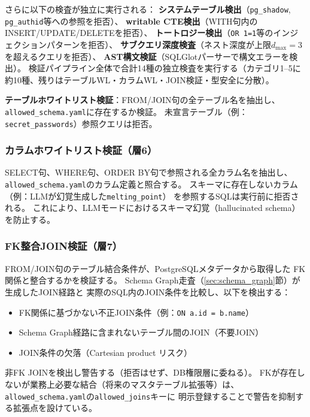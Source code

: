 \documentclass[5p,twocolumn]{elsarticle}
\begin{document}
さらに以下の検査が独立に実行される：
\textbf{システムテーブル検出}（\texttt{pg\_shadow}, \texttt{pg\_authid}等への参照を拒否）、
\textbf{writable CTE検出}（WITH句内のINSERT/UPDATE/DELETEを拒否）、
\textbf{トートロジー検出}（\texttt{OR 1=1}等のインジェクションパターンを拒否）、
\textbf{サブクエリ深度検査}（ネスト深度が上限$d_{\max}=3$を超えるクエリを拒否）、
\textbf{AST構文検証}（SQLGlotパーサーで構文エラーを検出）。
検証パイプライン全体で合計14種の独立検査を実行する（カテゴリ1--5に約10種、残りはテーブルWL・カラムWL・JOIN検証・型安全に分散）。

\textbf{テーブルホワイトリスト検証}：FROM/JOIN句の全テーブル名を抽出し、
\texttt{allowed\_schema.yaml}に存在するか検証。
未宣言テーブル（例：\texttt{secret\_passwords}）参照クエリは拒否。

\subsubsection{カラムホワイトリスト検証（層6）}
\label{sec:column_wl}

SELECT句、WHERE句、ORDER BY句で参照される全カラム名を抽出し、
\texttt{allowed\_schema.yaml}のカラム定義と照合する。
スキーマに存在しないカラム（例：LLMが幻覚生成した\texttt{melting\_point}）
を参照するSQLは実行前に拒否される。
これにより、LLMモードにおけるスキーマ幻覚（hallucinated schema）を防止する。

\subsubsection{FK整合JOIN検証（層7）}
\label{sec:join_validation}

FROM/JOIN句のテーブル結合条件が、PostgreSQLメタデータから取得した
FK関係と整合するかを検証する。
Schema Graph走査（\ref{sec:schema_graph}節）が生成したJOIN経路と
実際のSQL内のJOIN条件を比較し、以下を検出する：

\begin{itemize}
  \item FK関係に基づかない不正JOIN条件（例：\texttt{ON a.id = b.name}）
  \item Schema Graph経路に含まれないテーブル間のJOIN（不要JOIN）
  \item JOIN条件の欠落（Cartesian product リスク）
\end{itemize}

非FK JOINを検出し警告する（拒否はせず、DB権限層に委ねる）。
FKが存在しないが業務上必要な結合（将来のマスタテーブル拡張等）は、
\texttt{allowed\_schema.yaml}の\texttt{allowed\_joins}キーに
明示登録することで警告を抑制する拡張点を設けている。
\end{document}
